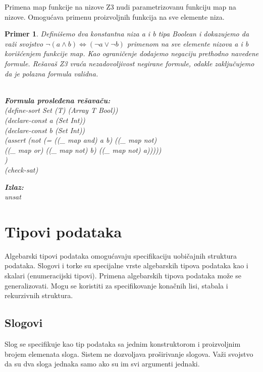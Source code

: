 \documentclass[12pt,oneside]{memoir}
\newcommand\tab[1][0.5cm]{\hspace*{#1}}
\newtheorem{primer}{Primer}
\begin{document}
Primena map funkcije na nizove
Z3 nudi parametrizovanu funkciju map na nizove. Omogućava primenu proizvoljnih funkcija na sve elemente niza.
\begin{primer} Definišemo dva konstantna niza a i b tipa Boolean i dokazujemo da važi svojstvo $\neg{(a \land b)} \Leftrightarrow (\neg{a} \lor \neg{b}) $ primenom na sve elemente nizova a i b korišćenjem funkcije map. Kao ograničenje dodajemo negaciju prethodno navedene formule. Rešavaš Z3 vraća nezadovoljivost negirane formule, odakle zaključujemo da je polazna formula validna.\\ \\
\begin{minipage}[b]{0.65\textwidth}
\textbf{Formula prosleđena rešavaču:}
\\(define-sort Set (T) (Array T Bool))
\\(declare-const a (Set Int))
\\(declare-const b (Set Int))
\\(assert (not (= ((\_ map and) a b) ((\_ map not) 
\\\tab((\_ map or) ((\_ map not) b) ((\_ map not) a)))))
\\)
\\(check-sat)
\end{minipage}
\hspace{2.5cm} 
\begin{minipage}[t]{0.5\textwidth}
\vspace{-4.65cm}
\textbf{Izlaz:}
\\unsat 
\end{minipage}
\end{primer}

\section{Tipovi podataka} \label{sec:num3}

Algebarski tipovi podataka omogućavaju specifikaciju uobičajnih struktura podataka. Slogovi i torke su specijalne vrste algebarskih tipova podataka kao i skalari (enumeracijski tipovi). Primena algebarskih tipova podataka može se generalizovati. Mogu se koristiti za specifikovanje konačnih lisi, stabala i rekurzivnih struktura. 
\subsection{Slogovi}
Slog se specifikuje kao tip podataka sa jednim konstruktorom i proizvoljnim brojem elemenata sloga. Sistem ne dozvoljava proširivanje slogova. Važi svojstvo da su dva sloga jednaka samo ako su im svi argumenti jednaki.
\end{document}
